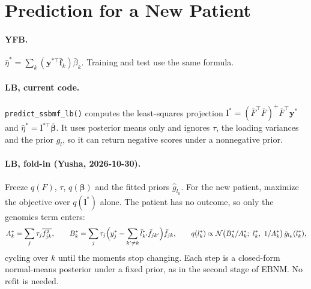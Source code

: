 \documentclass[11pt]{article}
\begin{document}
\section{Prediction for a New Patient}\label{sec:prediction}

\paragraph{YFB.} $\hat\eta^* = \sum_k(\bm y^{*\top}\bar{\bm f}_k)\bar\beta_k$. Training and
test use the same formula.

\paragraph{LB, current code.} \texttt{predict\_ssbmf\_lb()} computes the
least-squares projection $\bm l^* = (\bar F^\top\bar F)^{+}\bar F^\top\bm y^*$ and
$\hat\eta^* = \bm l^{*\top}\bar{\bm\beta}$. It uses posterior means only and ignores
$\tau$, the loading variances and the prior $g_l$, so it can return negative
scores under a nonnegative prior.

\paragraph{LB, fold-in (Yusha, 2026-10-30).} Freeze $q(F)$, $\tau$, $q(\bm\beta)$ and
the fitted priors $\hat g_{l_k}$. For the new patient, maximize the objective over
$q(\bm l^*)$ alone. The patient has no outcome, so only the genomics term enters:
\[
  A^*_k = \sum_j\tau_j\overline{f^2_{jk}}, \qquad
  B^*_k = \sum_j\tau_j\Bigl(y^*_j - \sum_{k'\ne k}\bar l^*_{k'}\bar f_{jk'}\Bigr)\bar f_{jk},
  \qquad
  q(l^*_k) \propto \mathcal N\bigl(B^*_k/A^*_k;\ l^*_k,\ 1/A^*_k\bigr)\,\hat g_{l_k}(l^*_k),
\]
cycling over $k$ until the moments stop changing. Each step is a closed-form
normal-means posterior under a fixed prior, as in the second stage of EBNM. No
refit is needed.
\end{document}
